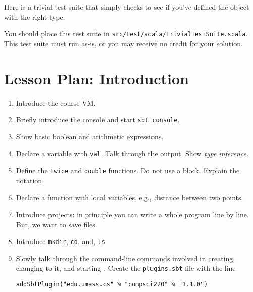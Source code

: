 \documentclass[9pt]{extbook}
\begin{document}
Here is a trivial test suite that simply checks to see if you've defined
the  object with the right type:


You should place this test suite in \texttt{src/test/scala/TrivialTestSuite.scala}. This test suite must run as-is, or you may receive no credit for your solution.





\chapter{Lesson Plan: Introduction}

\begin{enumerate}

\item Introduce the course VM.


\item Briefly introduce the console and start \verb|sbt console|.

\item Show basic boolean and arithmetic expressions.

\item Declare a variable with \lstinline|val|. Talk through the output.
Show \emph{type inference}.

\item Define the \lstinline|twice| and \lstinline|double| functions.
Do not use a block. Explain the notation.

\item Declare a function with local variables, e.g., distance between
two points.

\item Introduce projects: in principle you can write a whole program
line by line. But, we want to save files.

\item  Introduce \verb|mkdir|, \verb|cd|, and, \verb|ls|

\item Slowly talk through the command-line commands involved in
creating, changing to it, and starting \sbt{}. Create
the \texttt{plugins.sbt} file with the line

\begin{lstlisting}
addSbtPlugin("edu.umass.cs" % "compsci220" % "1.1.0")
\end{lstlisting}


\end{enumerate}
\end{document}
